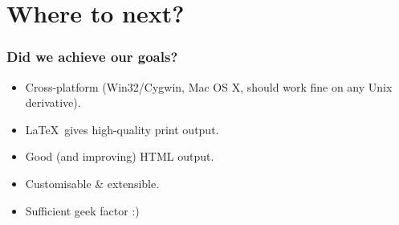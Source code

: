 \documentclass[pdftex]{beamer}
\begin{document}
\section[Future]{Where to next?}


\frame
{
	\frametitle{Did we achieve our goals?}
	
	\begin{itemize}
	
		\item Cross-platform (Win32/Cygwin, Mac OS X, should work fine
		on any Unix derivative).
		
		\item \LaTeX\ gives high-quality print output.
		
		\item Good (and improving) HTML output.
		
		\item Customisable \& extensible.
		
		\item Sufficient geek factor :)
		
	\end{itemize}
	
	\begin{center}
	
	
	\end{center}
}
\end{document}
